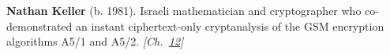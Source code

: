 \textbf{Nathan Keller} (b. 1981). Israeli mathematician and cryptographer who co-demonstrated an instant ciphertext-only cryptanalysis of the GSM encryption algorithms A5/1 and A5/2. \emph{[Ch.~\hyperref[ch:gsmencryptionorder]{12}]}

